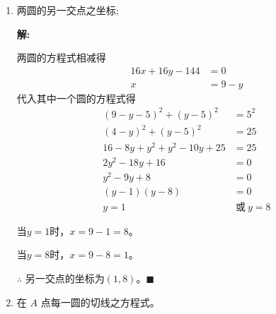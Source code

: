 \documentclass[10pt]{article}
\newcommand{\sol}{\textbf{解:} }
\begin{document}
\begin{enumerate}[leftmargin=*]
\begin{enumerate}
          \item 两圆的另一交点之坐标;

                \sol{}

                两圆的方程式相减得
                \begin{align*}
                  16x + 16y - 144 & = 0     \\
                  x               & = 9 - y
                \end{align*}
                代入其中一个圆的方程式得
                \begin{align*}
                  (9 - y - 5)^{2} + (y - 5)^{2}      & = 5^{2}           \\
                  (4 - y)^{2} + (y - 5)^{2}          & = 25              \\
                  16 - 8y + y^{2} + y^{2} - 10y + 25 & = 25              \\
                  2y^{2} - 18y + 16                  & = 0               \\
                  y^{2} - 9y + 8                     & = 0               \\
                  (y - 1)(y - 8)                     & = 0               \\
                  y = 1                              & \ \text{或}\ y = 8
                \end{align*}

                当$y = 1$时，$x = 9 - 1 = 8$。

                当$y = 8$时，$x = 9 - 8 = 1$。

                $\therefore$ 另一交点的坐标为$(1, 8)$。\hfill$\blacksquare$

          \item 在 $A$ 点每一圆的切线之方程式。


\end{enumerate}
\end{enumerate}
\end{document}
